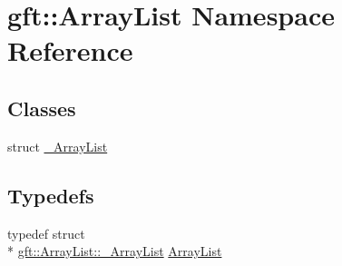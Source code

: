 \hypertarget{namespacegft_1_1ArrayList}{\section{gft\-:\-:Array\-List Namespace Reference}
\label{namespacegft_1_1ArrayList}
}
\subsection*{Classes}
\begin{DoxyCompactItemize}
\item 
struct \hyperlink{structgft_1_1ArrayList_1_1__ArrayList}{\-\_\-\-Array\-List}
\end{DoxyCompactItemize}
\subsection*{Typedefs}
\begin{DoxyCompactItemize}
\item 
typedef struct \\*
\hyperlink{structgft_1_1ArrayList_1_1__ArrayList}{gft\-::\-Array\-List\-::\-\_\-\-Array\-List} \hyperlink{namespacegft_1_1ArrayList_a597298ec8b05430a184d37236b272878}{Array\-List}
\end{DoxyCompactItemize}
